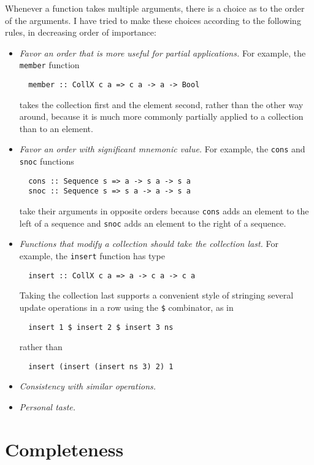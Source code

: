 \documentclass{report}
\newcommand{\cd}{\texttt}
\begin{document}
Whenever a function takes multiple arguments, there is a choice as to
the order of the arguments.  I have tried to make these choices according
to the following rules, in decreasing order of importance:
\begin{itemize}
\item \emph{Favor an order that is more useful for partial applications.}
For example, the \cd{member} function
\begin{verbatim}
  member :: CollX c a => c a -> a -> Bool
\end{verbatim}
takes the collection first and the element second, rather than the other
way around, because it is much more commonly partially applied to a
collection than to an element.

\item \emph{Favor an order with significant mnemonic value.}
For example, the \cd{cons} and \cd{snoc} functions
\begin{verbatim}
  cons :: Sequence s => a -> s a -> s a
  snoc :: Sequence s => s a -> a -> s a
\end{verbatim}
take their arguments in opposite orders because \cd{cons} adds an
element to the left of a sequence and \cd{snoc} adds an element to the
right of a sequence.

\item \emph{Functions that modify a collection should take the collection last.}
For example, the \cd{insert} function has type
\begin{verbatim}
  insert :: CollX c a => a -> c a -> c a
\end{verbatim}
Taking the collection last supports a convenient style of stringing several
update operations in a row using the \cd{\$} combinator, as in
\begin{verbatim}
  insert 1 $ insert 2 $ insert 3 ns
\end{verbatim}
rather than
\begin{verbatim}
  insert (insert (insert ns 3) 2) 1
\end{verbatim}

\item \emph{Consistency with similar operations.}
\item \emph{Personal taste.}
\end{itemize}

\section{Completeness}
\end{document}
